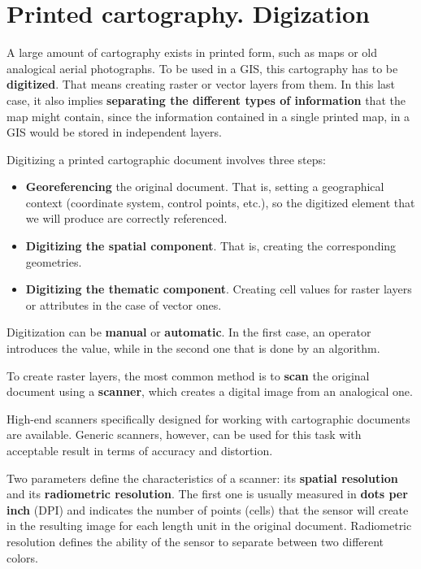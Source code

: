 \section{Printed cartography. Digization}

A large amount of cartography exists in printed form, such as maps or old analogical aerial photographs. To be used in a GIS, this cartography has to be \textbf{digitized}. That means creating raster or vector layers from them. In this last case, it also implies \textbf{separating the different types of information} that the map might contain, since the information contained in a single printed map, in a GIS would be stored in independent layers.

Digitizing a printed cartographic document involves three steps: 

\begin{itemize}
\item \textbf{Georeferencing} the original document. That is, setting a geographical context (coordinate system, control points, etc.), so the digitized element that we will produce are correctly referenced.
\item \textbf{Digitizing the spatial component}. That is, creating the corresponding geometries.
\item \textbf{Digitizing the thematic component}. Creating cell values for raster layers or attributes in the case of vector ones.
\end{itemize}

Digitization can be \textbf{manual} or \textbf{automatic}. In the first case, an operator introduces the value, while in the second one that is done by an algorithm.

To create raster layers, the most common method is to \textbf{scan} the original document using a \textbf{scanner}, which creates a digital image from an analogical one.

High-end scanners specifically designed for working with cartographic documents are available. Generic scanners, however, can be used for this task with acceptable result in terms of accuracy and distortion. 

Two parameters define the characteristics of a scanner: its \textbf{spatial resolution} and its \textbf{radiometric resolution}. The first one is usually measured in \textbf{dots per inch} (DPI) and indicates the number of points (cells) that the sensor will create in the resulting image for each length unit in the original document. Radiometric resolution defines the ability of the sensor to separate between two different colors.

